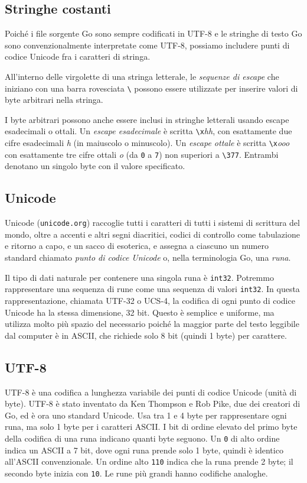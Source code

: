 \subsection{Stringhe costanti}
\label{subsec:stringhe_costanti}%
Poiché i file sorgente Go sono sempre codificati in UTF-8 e le stringhe di testo Go sono convenzionalmente interpretate come UTF-8, possiamo includere punti di codice Unicode fra i caratteri di stringa.


All'interno delle virgolette di una stringa letterale, le \textit{sequenze di escape} che iniziano con una barra rovesciata \verb|\| possono essere utilizzate per inserire valori di byte arbitrari nella stringa.

I byte arbitrari possono anche essere inclusi in stringhe letterali usando escape esadecimali o ottali.
Un \textit{escape esadecimale} è scritta \verb|\x|\textit{hh}, con esattamente due cifre esadecimali \textit{h} (in maiuscolo o minuscolo).
Un \textit{escape ottale} è scritta \verb|\x|\textit{ooo} con esattamente tre cifre ottali \textit{o} (da \verb|0| a \verb|7|) non superiori a \verb|\377|.
Entrambi denotano un singolo byte con il valore specificato.

\subsection{Unicode}
\label{subsec:unicode}%
Unicode (\verb|unicode.org|) raccoglie tutti i caratteri di tutti i sistemi di scrittura del mondo, oltre a accenti e altri segni diacritici, codici di controllo come tabulazione e ritorno a capo, e un sacco di esoterica, e assegna a ciascuno un numero standard chiamato \textit{punto di codice Unicode} o, nella terminologia Go, una \textit{runa}.

Il tipo di dati naturale per contenere una singola runa è \verb|int32|.
Potremmo rappresentare una sequenza di rune come una sequenza di valori \verb|int32|.
In questa rappresentazione, chiamata UTF-32 o UCS-4, la codifica di ogni punto di codice Unicode ha la stessa dimensione, 32 bit.
Questo è semplice e uniforme, ma utilizza molto più spazio del necessario poiché la maggior parte del testo leggibile dal computer è in ASCII, che richiede solo 8 bit (quindi 1 byte) per carattere.

\subsection{UTF-8}
\label{subsec:utf8}%
UTF-8 è una codifica a lunghezza variabile dei punti di codice Unicode (unità di byte).
UTF-8 è stato inventato da Ken Thompson e Rob Pike, due dei creatori di Go, ed è ora uno standard Unicode.
Usa tra 1 e 4 byte per rappresentare ogni runa, ma solo 1 byte per i caratteri ASCII\@.
I bit di ordine elevato del primo byte della codifica di una runa indicano quanti byte seguono.
Un \verb|0| di alto ordine indica un ASCII a 7 bit, dove ogni runa prende solo 1 byte, quindi è identico all'ASCII convenzionale.
Un ordine alto \verb|110| indica che la runa prende 2 byte;
il secondo byte inizia con \verb|10|.
Le rune più grandi hanno codifiche analoghe.

